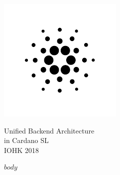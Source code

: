 \documentclass[$if(fontsize)$$fontsize$$endif$,oneside]{article}
\newcommand*{\cardanosltitle}{\begingroup
\newlength{\drop} %
\drop=0.1\textheight %

\vspace{\drop} %
\centering %

\begin{center}
  \includegraphics[scale=0.5]{cardano-logo.png}
\end{center}

{\huge Unified Backend Architecture}\\[0.5\baselineskip]
{\Large in Cardano SL}\\[0.5\baselineskip]

\vfill
{\large \textcopyright \textsc{ IOHK 2018}}\par
\endgroup}
\begin{document}
\pagestyle{empty}
\cardanosltitle
\newpage

\begin{abstract}
This article provides technical specification for Unified Backend Architecture in Cardano SL.
\end{abstract}

\hypersetup{linkcolor=black}
\setcounter{secnumdepth}{0}
\setcounter{tocdepth}{3}
\pagestyle{empty}
\doublespacing %
\tableofcontents
\singlespacing
\thispagestyle{empty}
\clearpage

\pagestyle{fancy}
\fancyhf{}
\fancyhead[L]{\fontsize{10}{12} \selectfont \rmfamily{\nouppercase\leftmark}}
\fancyhead[R]{\fontsize{10}{12} \selectfont \rmfamily{\thepage}}

$body$
\end{document}
